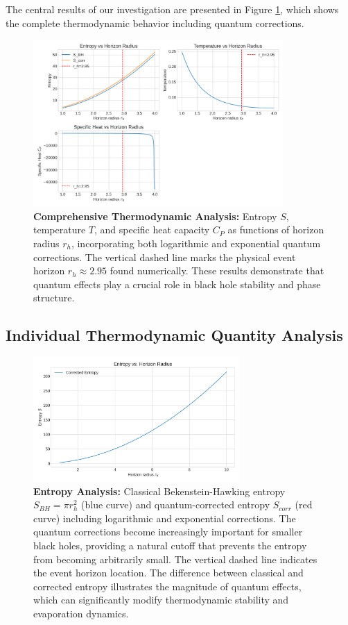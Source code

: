 \documentclass[12pt]{article}
\begin{document}
The central results of our investigation are presented in Figure \ref{fig:notebook_fig3}, which shows the complete thermodynamic behavior including quantum corrections.

\begin{figure}[H]
    \centering
    \includegraphics[width=0.85\textwidth]{figures/figure_3.png}
    \caption{\textbf{Comprehensive Thermodynamic Analysis:} Entropy $S$, temperature $T$, and specific heat capacity $C_P$ as functions of horizon radius $r_h$, incorporating both logarithmic and exponential quantum corrections. The vertical dashed line marks the physical event horizon $r_h \approx 2.95$ found numerically. These results demonstrate that quantum effects play a crucial role in black hole stability and phase structure.}
    \label{fig:notebook_fig3}
\end{figure}

\subsection{Individual Thermodynamic Quantity Analysis}

\begin{figure}[H]
    \centering
    \includegraphics[width=0.7\textwidth]{figures/entropy_vs_rh.png}
    \caption{\textbf{Entropy Analysis:} Classical Bekenstein-Hawking entropy $S_{BH} = \pi r_h^2$ (blue curve) and quantum-corrected entropy $S_{corr}$ (red curve) including logarithmic and exponential corrections. The quantum corrections become increasingly important for smaller black holes, providing a natural cutoff that prevents the entropy from becoming arbitrarily small. The vertical dashed line indicates the event horizon location. The difference between classical and corrected entropy illustrates the magnitude of quantum effects, which can significantly modify thermodynamic stability and evaporation dynamics.}
    \label{fig:entropy_vs_rh}
\end{figure}
\end{document}
